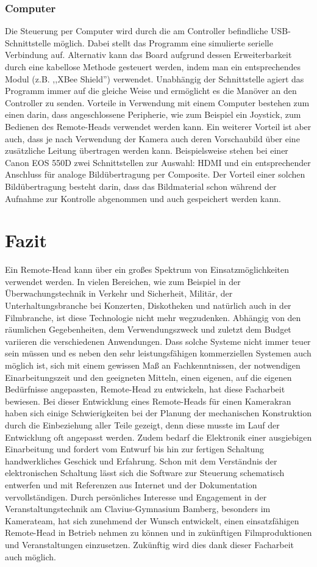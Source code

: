 \documentclass[a4paper, 12pt, bibtotocnumbered, liststotocnumbered]{scrartcl}
\begin{document}
	\subsubsection{Computer}
	Die Steuerung per Computer wird durch die am Controller befindliche USB-Schnittstelle möglich. Dabei stellt das Programm eine simulierte serielle Verbindung auf. Alternativ kann das Board aufgrund dessen Erweiterbarkeit durch eine kabellose Methode gesteuert werden, indem man ein entsprechendes Modul (z.B. ,,XBee Shield”) verwendet. Unabhängig der Schnittstelle agiert das Programm immer auf die gleiche Weise und ermöglicht es die Manöver an den Controller zu senden. Vorteile in Verwendung mit einem Computer bestehen zum einen darin, dass angeschlossene Peripherie, wie zum Beispiel ein Joystick, zum Bedienen des Remote-Heads verwendet werden kann. Ein weiterer Vorteil ist aber auch, dass je nach Verwendung der Kamera auch deren Vorschaubild über eine zusätzliche Leitung übertragen werden kann. Beispielsweise stehen bei einer Canon EOS 550D zwei Schnittstellen zur Auswahl: HDMI und ein entsprechender Anschluss für analoge Bildübertragung per Composite. Der Vorteil einer solchen Bildübertragung besteht darin, dass das Bildmaterial schon während der Aufnahme zur Kontrolle abgenommen und auch gespeichert werden kann.

	\section{Fazit}
	Ein Remote-Head kann über ein großes Spektrum von Einsatzmöglichkeiten verwendet werden. In vielen Bereichen, wie zum Beispiel in der Überwachungstechnik in Verkehr und Sicherheit, Militär, der Unterhaltungsbranche bei Konzerten, Diskotheken und natürlich auch in der Filmbranche, ist diese Technologie nicht mehr wegzudenken.  Abhängig von den räumlichen Gegebenheiten, dem Verwendungszweck und zuletzt dem Budget variieren die verschiedenen Anwendungen. Dass solche Systeme nicht immer teuer sein müssen und es neben den sehr leistungsfähigen kommerziellen Systemen auch möglich ist, sich mit einem gewissen Maß an Fachkenntnissen, der notwendigen Einarbeitungszeit und den geeigneten Mitteln, einen eigenen, auf die eigenen Bedürfnisse angepassten, Remote-Head zu entwickeln, hat diese Facharbeit bewiesen. Bei dieser Entwicklung eines Remote-Heads für einen Kamerakran haben sich einige Schwierigkeiten bei der Planung der mechanischen Konstruktion durch die Einbeziehung aller Teile gezeigt, denn diese musste im Lauf der Entwicklung oft angepasst werden. Zudem bedarf die Elektronik einer ausgiebigen Einarbeitung und fordert vom Entwurf bis hin zur fertigen Schaltung handwerkliches Geschick und Erfahrung. Schon mit dem Verständnis der elektronischen Schaltung lässt sich die Software zur Steuerung schematisch entwerfen und mit Referenzen aus Internet und der Dokumentation vervollständigen.
	Durch persönliches Interesse und Engagement in der Veranstaltungstechnik am Clavius-Gymnasium Bamberg, besonders im Kamerateam, hat sich zunehmend der Wunsch entwickelt, einen einsatzfähigen Remote-Head in Betrieb nehmen zu können und in zukünftigen Filmproduktionen und Veranstaltungen einzusetzen. Zukünftig wird dies dank dieser Facharbeit auch möglich.
\end{document}

